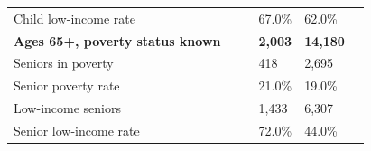 \documentclass[9pt]{report}
\begin{document}
\begin{tabular}{p{.10in}p{.10in}p{.10in}p{3.7in}>{\hfill}p{.85in}>{\hfill}p{.85in}>{\hfill}p{.85in}>{\hfill}p{.85in}p{0.1in}}
\multicolumn{4}{l}{\parbox{3.6in}{\strut\raggedright{{Child low-income rate}}\strut}} &  &  & 67.0\% & 62.0\% & \multicolumn{1}{l}{}  \\ 
\multicolumn{4}{l}{\parbox{3.5in}{\strut\raggedright{\textbf{Ages 65+, poverty status known}\strut}}} & \textbf{} & \textbf{} & \textbf{2,003} & \textbf{14,180} & \textbf{} \\ 
\multicolumn{4}{l}{\parbox{3.6in}{\strut\raggedright{{Seniors in poverty}}\strut}} &  &  & 418 & 2,695 & \multicolumn{1}{l}{}  \\ 
\multicolumn{4}{l}{\parbox{3.6in}{\strut\raggedright{{Senior poverty rate}}\strut}} &  &  & 21.0\% & 19.0\% & \multicolumn{1}{l}{}  \\ 
\multicolumn{4}{l}{\parbox{3.6in}{\strut\raggedright{{Low-income seniors}}\strut}} &  &  & 1,433 & 6,307 & \multicolumn{1}{l}{}  \\ 
\multicolumn{4}{l}{\parbox{3.6in}{\strut\raggedright{{Senior low-income rate}}\strut}} &  &  & 72.0\% & 44.0\% & \multicolumn{1}{l}{}  \\ 

\end{tabular}
\setlength{\tabcolsep}{6pt} %
\end{document}

